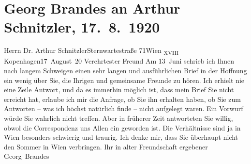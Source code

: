 

         \renewcommand{\erwaehnteOrte}{Orte: Kopenhagen, Sternwartestraße, Wien, XVIII., Währing}
         \renewcommand{\erwaehnteWerke}{}
               \section[Georg Brandes an Arthur Schnitzler, 17. 8. 1920]{ Georg Brandes an Arthur Schnitzler, 17. 8. 1920}\nopagebreak{}\rehead{ }\begin{ledgroupsized}[t]{13cm}\normalsize\beginnumbering \toendnotes[C]{\smallbreak\pagebreak[2]} 
\toendnotes[C]{\smallbreak}\pstart{}{\pb}Herrn Dr. Arthur
                  Schnitzler\pend{}\pstart{}Sternwartestraße 71\pend{}\pstart{}Wien \textsubscript{XVIII}\pend{}{\bigskip}\pstart
           \raggedleft{}{\pb}Kopenhagen17 August 20\pend
           \pstart{}Verehrtester Freund\pend\pstart
           Am 13 Juni schrieb ich Ihnen nach langem Schweigen einen sehr langen und
               ausführlichen Brief in der Hoffnung ein wenig über Sie, die Ihrigen und gemeinsame
               Freunde zu hören.\pend
           \pstart
           Ich erhielt nie eine Zeile Antwort, und da es immerhin möglich ist, dass mein Brief
               Sie nicht erreicht hat, erlaube ich mir die Anfrage, ob Sie ihn erhalten haben, ob
               Sie zum Antworten – was ich höchst natürlich finde – nicht aufgelegt waren. Ein
               Vorwurf würde Sie wahrlich nicht treffen. Aber in früherer Zeit antworteten Sie
               willig, obwol {\pb}die Correspondenz
               uns Allen ein \label{K_L02354_1v}\label{K_L02354_1h} geworden
               ist.\pend
           \pstart
           Die Verhältnisse sind ja in Wien besonders
               schwierig und traurig. Ich denke mir, dass Sie überhaupt nicht den Sommer in Wien verbringen.\pend
           \pstart Ihr in alter Freundschaft ergebener \spacefill\mbox{Georg Brandes}\pend{}
         
         \endnumbering{}\end{ledgroupsized}  \newcommand{\dateiname}{L02354}\newcommand{\titel}{Georg Brandes an Arthur Schnitzler, 17. 8. 1920}\newcommand{\editorInnen}{Martin Anton Müller und Gerd-Hermann Susen}
      